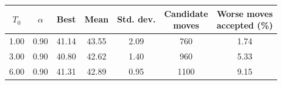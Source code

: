 \begin{tabular}{ccccccc}
\toprule
$T_0$ & $\alpha$ & Best & Mean & Std. dev. & \makecell{Candidate\\moves} & \makecell{Worse moves\\accepted (\%)} \\
\midrule
1.00 & 0.90 & 41.14 & 43.55 & 2.09 & 760 & 1.74 \\
3.00 & 0.90 & 40.80 & 42.62 & 1.40 & 960 & 5.33 \\
6.00 & 0.90 & 41.31 & 42.89 & 0.95 & 1100 & 9.15 \\
\bottomrule
\end{tabular}
